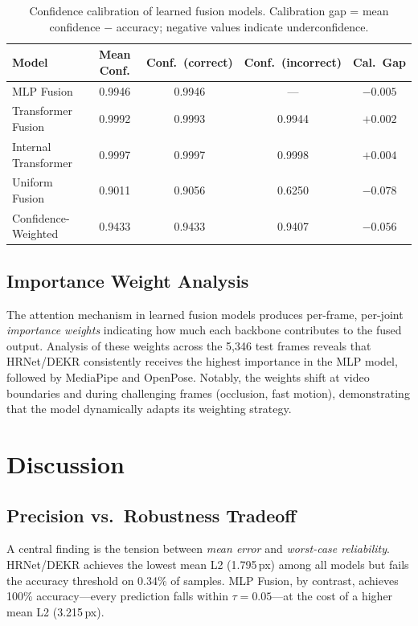 \documentclass[11pt,a4paper]{article}
\begin{document}
\begin{table}[H]
\centering
\caption{Confidence calibration of learned fusion models.  Calibration gap =
         mean confidence $-$ accuracy; negative values indicate
         underconfidence.}
\label{tab:calibration}
\begin{tabular}{@{}lcccc@{}}
\toprule
\textbf{Model} & \textbf{Mean Conf.} & \textbf{Conf.\ (correct)} & \textbf{Conf.\ (incorrect)} & \textbf{Cal.\ Gap} \\
\midrule
MLP Fusion                  & 0.9946 & 0.9946 & ---    & $-0.005$ \\
Transformer Fusion          & 0.9992 & 0.9993 & 0.9944 & $+0.002$ \\
Internal Transformer        & 0.9997 & 0.9997 & 0.9998 & $+0.004$ \\
Uniform Fusion              & 0.9011 & 0.9056 & 0.6250 & $-0.078$ \\
Confidence-Weighted         & 0.9433 & 0.9433 & 0.9407 & $-0.056$ \\
\bottomrule
\end{tabular}
\end{table}

\subsection{Importance Weight Analysis}

The attention mechanism in learned fusion models produces per-frame, per-joint
\emph{importance weights} indicating how much each backbone contributes to the
fused output.  Analysis of these weights across the 5{,}346 test frames reveals
that HRNet/DEKR consistently receives the highest importance in the MLP model,
followed by MediaPipe and OpenPose.  Notably, the weights shift at video
boundaries and during challenging frames (occlusion, fast motion), demonstrating
that the model dynamically adapts its weighting strategy.

\section{Discussion}\label{sec:discussion}

\subsection{Precision vs.\ Robustness Tradeoff}

A central finding is the tension between \emph{mean error} and
\emph{worst-case reliability}.  HRNet/DEKR achieves the lowest mean L2
(1.795\,px) among all models but fails the accuracy threshold on 0.34\% of
samples.  MLP Fusion, by contrast, achieves 100\% accuracy---every prediction
falls within $\tau{=}0.05$---at the cost of a higher mean L2 (3.215\,px).
\end{document}
